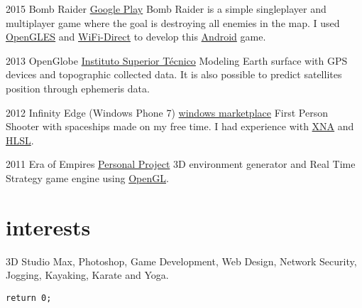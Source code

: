 \documentclass[]{friggeri-cv}
\begin{document}
\begin{entrylist}
  
  \entry
    {2015}
    {Bomb Raider}
    {\href{http://play.google.com/store/apps/details?id=pt.ist.bombraider}{Google Play}}
    {Bomb Raider is a simple singleplayer and multiplayer game where the goal is destroying all enemies in the map. I used \underline{OpenGLES} and \underline{WiFi-Direct} to develop this \underline{Android} game.}

  \entry
    {2013}
    {OpenGlobe}
    {\href{http://web.ist.utl.pt/ist168621/?page=10}{Instituto Superior Técnico}}
    {Modeling Earth surface with GPS devices and topographic collected data. It is also possible to predict satellites position through ephemeris data.}

  \entry
    {2012}
    {Infinity Edge (Windows Phone 7)}
    {\href{http://www.windowsphone.com/en-us/store/app/infinity-edge/05516463-3a89-4351-996e-62e5b4519aeb}{windows marketplace}}
    {First Person Shooter with spaceships made on my free time. I had experience with \underline{XNA} and \underline{HLSL}.}

  \entry
    {2011}
    {Era of Empires}
    {\href{http://web.ist.utl.pt/ist168621/?page=8}{Personal Project}}
    {3D environment generator and Real Time Strategy game engine using \underline{OpenGL}.}


\end{entrylist}

\section{interests}
    3D Studio Max, Photoshop, Game Development, Web Design, Network Security, Jogging, Kayaking, Karate and Yoga.

	
%
%


\begin{lstlisting}
return 0;
\end{lstlisting}
\end{document}
